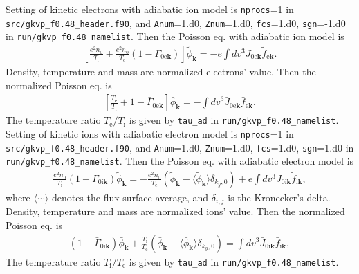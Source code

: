 Setting of kinetic electrons with adiabatic ion model is \texttt{nprocs}=1 in \texttt{src/gkvp\_f0.48\_header.f90}, and \texttt{Anum}=1.d0, \texttt{Znum}=1.d0, \texttt{fcs}=1.d0, \texttt{sgn}=-1.d0 in \texttt{run/gkvp\_f0.48\_namelist}. Then the Poisson eq. with adiabatic ion model is 
\begin{align}
  \left[ \frac{e^2 n_\mathrm{0}}{T_\mathrm{i}} + \frac{e^2 n_\mathrm{0}}{T_\mathrm{e}} \left( 1 - \Gamma_{0\mathrm{e}\bm{k}} \right) \right] \tilde{\phi}_{\bm{k}} = - e \int dv^3 J_{0\mathrm{e}\bm{k}} \tilde{f}_{\mathrm{e}\bm{k}}.
\end{align}
Density, temperature and mass are normalized electrons' value. Then the normalized Poisson eq. is
\begin{align}
  \left[ \frac{T_\mathrm{e}}{T_\mathrm{i}} + 1 - \bar{\Gamma}_{0\mathrm{e}\bm{k}} \right] \bar{\phi}_{\bm{k}} = - \int d\bar{v}^3 \bar{J}_{0\mathrm{e}\bm{k}} \bar{f}_{\mathrm{e}\bm{k}}.
\end{align}
The temperature ratio $T_\mathrm{e}/T_\mathrm{i}$ is given by \texttt{tau\_ad} in \texttt{run/gkvp\_f0.48\_namelist}.\\

Setting of kinetic ions with adiabatic electron model is \texttt{nprocs}=1 in \texttt{src/gkvp\_f0.48\_header.f90}, and \texttt{Anum}=1.d0, \texttt{Znum}=1.d0, \texttt{fcs}=1.d0, \texttt{sgn}=1.d0 in \texttt{run/gkvp\_f0.48\_namelist}. Then the Poisson eq. with adiabatic electron model is 
\begin{align}
  \frac{e^2 n_\mathrm{0}}{T_\mathrm{i}} \left( 1 - \Gamma_{0\mathrm{i}\bm{k}} \right) \tilde{\phi}_{\bm{k}} = - \frac{e^2n_\mathrm{0}}{T_\mathrm{e}} \left( \tilde{\phi}_{\bm{k}} - \langle \tilde{\phi}_{\bm{k}} \rangle \delta_{k_y,0} \right) + e \int dv^3 J_{0\mathrm{i}\bm{k}} \tilde{f}_{\mathrm{i}\bm{k}},
\end{align}
where $\langle \cdots \rangle$ denotes the flux-surface average, and $\delta_{i,j}$ is the Kronecker's delta. Density, temperature and mass are normalized ions' value. Then the normalized Poisson eq. is
\begin{align}
  \left( 1 - \bar{\Gamma}_{0\mathrm{i}\bm{k}} \right) \bar{\phi}_{\bm{k}} + \frac{T_\mathrm{i}}{T_\mathrm{e}} \left( \bar{\phi}_{\bm{k}} - \langle \bar{\phi}_{\bm{k}} \rangle \delta_{k_y,0} \right) = \int dv^3 \bar{J}_{0\mathrm{i}\bm{k}} \bar{f}_{\mathrm{i}\bm{k}},
\end{align}
The temperature ratio $T_\mathrm{i}/T_\mathrm{e}$ is given by \texttt{tau\_ad} in \texttt{run/gkvp\_f0.48\_namelist}.


